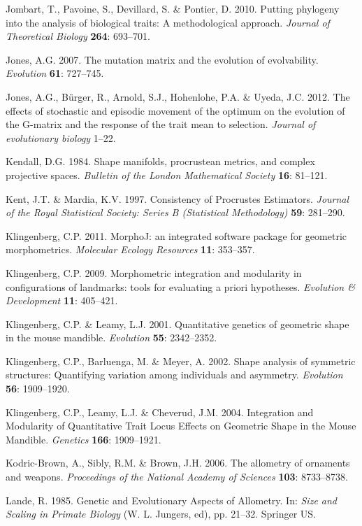 \documentclass[12pt,twoside]{report}
\begin{document}
Jombart, T., Pavoine, S., Devillard, S. \& Pontier, D. 2010. Putting
phylogeny into the analysis of biological traits: A methodological
approach. \emph{Journal of Theoretical Biology} \textbf{264}: 693--701.

Jones, A.G. 2007. The mutation matrix and the evolution of evolvability.
\emph{Evolution} \textbf{61}: 727--745.

Jones, A.G., Bürger, R., Arnold, S.J., Hohenlohe, P.A. \& Uyeda, J.C.
2012. The effects of stochastic and episodic movement of the optimum on
the evolution of the G-matrix and the response of the trait mean to
selection. \emph{Journal of evolutionary biology} 1--22.

Kendall, D.G. 1984. Shape manifolds, procrustean metrics, and complex
projective spaces. \emph{Bulletin of the London Mathematical Society}
\textbf{16}: 81--121.

Kent, J.T. \& Mardia, K.V. 1997. Consistency of Procrustes Estimators.
\emph{Journal of the Royal Statistical Society: Series B (Statistical
Methodology)} \textbf{59}: 281--290.

Klingenberg, C.P. 2011. MorphoJ: an integrated software package for
geometric morphometrics. \emph{Molecular Ecology Resources} \textbf{11}:
353--357.

Klingenberg, C.P. 2009. Morphometric integration and modularity in
configurations of landmarks: tools for evaluating a priori hypotheses.
\emph{Evolution \& Development} \textbf{11}: 405--421.

Klingenberg, C.P. \& Leamy, L.J. 2001. Quantitative genetics of
geometric shape in the mouse mandible. \emph{Evolution} \textbf{55}:
2342--2352.

Klingenberg, C.P., Barluenga, M. \& Meyer, A. 2002. Shape analysis of
symmetric structures: Quantifying variation among individuals and
asymmetry. \emph{Evolution} \textbf{56}: 1909--1920.

Klingenberg, C.P., Leamy, L.J. \& Cheverud, J.M. 2004. Integration and
Modularity of Quantitative Trait Locus Effects on Geometric Shape in the
Mouse Mandible. \emph{Genetics} \textbf{166}: 1909--1921.

Kodric-Brown, A., Sibly, R.M. \& Brown, J.H. 2006. The allometry of
ornaments and weapons. \emph{Proceedings of the National Academy of
Sciences} \textbf{103}: 8733--8738.

Lande, R. 1985. Genetic and Evolutionary Aspects of Allometry. In:
\emph{Size and Scaling in Primate Biology} (W. L. Jungers, ed), pp.
21--32. Springer US.
\end{document}
